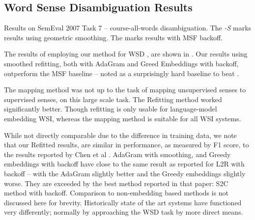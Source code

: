 \documentclass{article}
\def\parencite{\cite}
\begin{document}
\subsection{Word Sense Disambiguation Results} \label{WSDtask}
\begin{table}
	\begin{adjustbox}{max width=\columnwidth}
	\end{adjustbox}

	\caption{Results on SemEval 2007 Task 7 -- course-all-words disambiguation.
	The \emph{-S} marks results using geometric smoothing.
	The \emph{\textasteriskcentered } marks results with MSF backoff.
	} \label{samevalres}
\end{table}

The results of employing our method for WSD , are shown in . Our results using smoothed refitting, both with AdaGram and Greed Embeddings with backoff, outperform the MSF baseline -- noted as a surprisingly hard baseline to beat \parencite{Chen2014}.

The mapping method \parencite{agirre2006}  was not up to the task of mapping unsupervised senses to supervised senses, on this large scale task. The Refitting method worked significantly better. Though refitting is only usable for language-model embedding WSI, whereas the mapping method is suitable for all WSI systems.

While not directly comparable due to the difference in training data, we note that our Refitted results, are similar in performance, as measured by F1 score, to the results reported by Chen et al .
AdaGram with smoothing, and Greedy embeddings with backoff have close to the same result as reported for L2R with backoff -- with the AdaGram slightly better and the Greedy embeddings slightly worse. They are exceeded by the best method reported in that paper: S2C method with backoff.
Comparison to non-embedding based methods is not discussed here for brevity.
Historically state of the art systems have functioned very differently; normally by approaching the WSD task by more direct means. %
\end{document}
